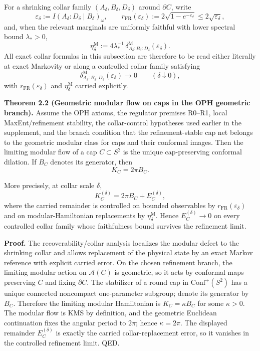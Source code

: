 For a shrinking collar family \((A_\delta,B_\delta,D_\delta)\) around \(\partial C\), write
\[
\varepsilon_\delta:=I(A_\delta:D_\delta\mid B_\delta)_\omega,
\qquad
r_{\mathrm{FR}}(\varepsilon_\delta):=
2\sqrt{1-e^{-\varepsilon_\delta}}
\le 2\sqrt{\varepsilon_\delta},
\]
and, when the relevant marginals are uniformly faithful with lower spectral bound \(\lambda_\ast>0\),
\[
\eta_\delta^{\mathrm M}
:=
4\lambda_\ast^{-1}\,
\delta^{\mathrm M}_{A_\delta:B_\delta:D_\delta}(\varepsilon_\delta).
\]
All exact collar formulas in this subsection are therefore to be read either literally at exact Markovity or along a controlled collar family satisfying
\[
\delta^{\mathrm M}_{A_\delta:B_\delta:D_\delta}(\varepsilon_\delta)\to 0
\qquad(\delta\downarrow 0),
\]
with \(r_{\mathrm{FR}}(\varepsilon_\delta)\) and \(\eta_\delta^{\mathrm M}\) carried explicitly.

\textbf{Theorem 2.2 (Geometric modular flow on caps in the OPH geometric branch).} Assume the OPH axioms, the regulator premises R0--R1, local MaxEnt/refinement stability, the collar-control hypotheses used earlier in the supplement, and the branch condition that the refinement-stable cap net belongs to the geometric modular class for caps and their conformal images. Then the limiting modular flow of a cap \(C\subset S^2\) is the unique cap-preserving conformal dilation. If \(B_C\) denotes its generator, then
\[
K_C=2\pi B_C.
\]

More precisely, at collar scale \(\delta\),
\[
K_C^{(\delta)}=2\pi B_C+E_C^{(\delta)},
\]
where the carried remainder is controlled on bounded observables by \(r_{\mathrm{FR}}(\varepsilon_\delta)\) and on modular-Hamiltonian replacements by \(\eta_\delta^{\mathrm M}\). Hence \(E_C^{(\delta)}\to 0\) on every controlled collar family whose faithfulness bound survives the refinement limit.

\textbf{Proof.} The recoverability/collar analysis localizes the modular defect to the shrinking collar and allows replacement of the physical state by an exact Markov reference with explicit carried error. On the chosen refinement branch, the limiting modular action on \(\mathcal A(C)\) is geometric, so it acts by conformal maps preserving \(C\) and fixing \(\partial C\). The stabilizer of a round cap in \(\mathrm{Conf}^+(S^2)\) has a unique connected noncompact one-parameter subgroup; denote its generator by \(B_C\). Therefore the limiting modular Hamiltonian is \(K_C=\kappa B_C\) for some \(\kappa>0\). The modular flow is KMS by definition, and the geometric Euclidean continuation fixes the angular period to \(2\pi\); hence \(\kappa=2\pi\). The displayed remainder \(E_C^{(\delta)}\) is exactly the carried collar-replacement error, so it vanishes in the controlled refinement limit. QED.

